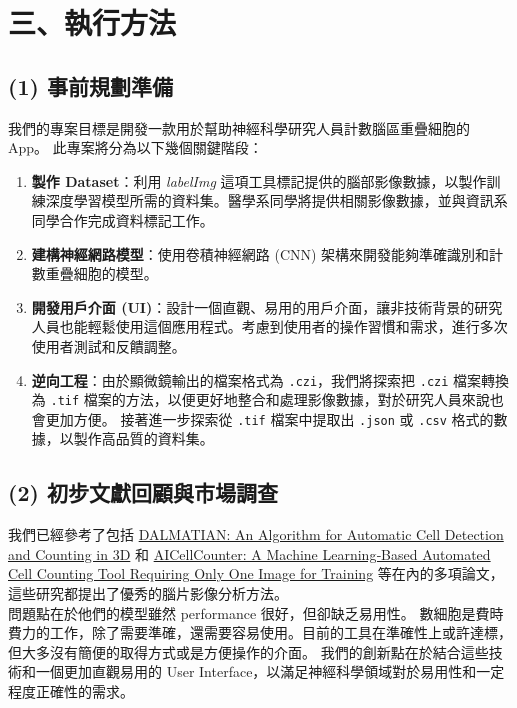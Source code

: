 \documentclass[12pt,a4paper]{article}
\begin{document}
\section*{三、執行方法}

\subsection*{(1) 事前規劃準備}
我們的專案目標是開發一款用於幫助神經科學研究人員計數腦區重疊細胞的 App。
此專案將分為以下幾個關鍵階段：
\begin{enumerate}
    \item \textbf{製作 Dataset}：利用 \textit{labelImg} 這項工具標記提供的腦部影像數據，以製作訓練深度學習模型所需的資料集。醫學系同學將提供相關影像數據，並與資訊系同學合作完成資料標記工作。
    \item \textbf{建構神經網路模型}：使用卷積神經網路 (CNN) 架構來開發能夠準確識別和計數重疊細胞的模型。
    \item \textbf{開發用戶介面 (UI)}：設計一個直觀、易用的用戶介面，讓非技術背景的研究人員也能輕鬆使用這個應用程式。考慮到使用者的操作習慣和需求，進行多次使用者測試和反饋調整。
    \item \textbf{逆向工程}：由於顯微鏡輸出的檔案格式為 \texttt{.czi}，我們將探索把 \texttt{.czi} 檔案轉換為 \texttt{.tif} 檔案的方法，以便更好地整合和處理影像數據，對於研究人員來說也會更加方便。
    接著進一步探索從 \texttt{.tif} 檔案中提取出 \texttt{.json} 或 \texttt{.csv} 格式的數據，以製作高品質的資料集。
\end{enumerate}

\subsection*{(2) 初步文獻回顧與市場調查}
我們已經參考了包括 \href{https://www.frontiersin.org/articles/10.3389/fnana.2017.00117/full}{DALMATIAN: An Algorithm for Automatic Cell Detection and Counting in 3D}
 和 
\href{https://www.nature.com/articles/s41598-020-75835-7}{AICellCounter: A Machine Learning‐Based Automated Cell Counting Tool Requiring Only One Image for Training} 等在內的多項論文，
這些研究都提出了優秀的腦片影像分析方法。\\
問題點在於他們的模型雖然 performance 很好，但卻缺乏易用性。
數細胞是費時費力的工作，除了需要準確，還需要容易使用。目前的工具在準確性上或許達標，但大多沒有簡便的取得方式或是方便操作的介面。
我們的創新點在於結合這些技術和一個更加直觀易用的 User Interface，以滿足神經科學領域對於易用性和一定程度正確性的需求。
\end{document}
